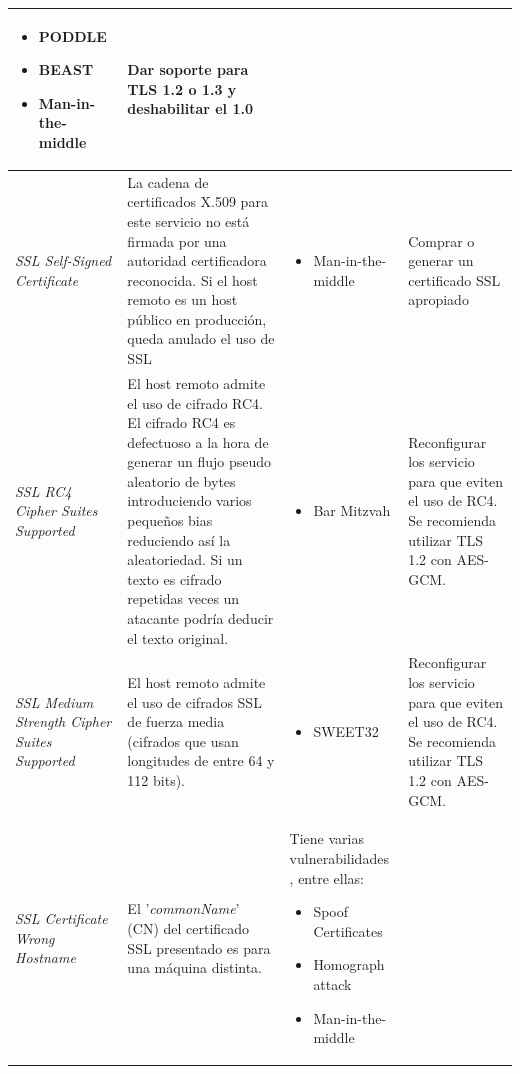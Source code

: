 \documentclass[10pt,a4paper]{article}
\begin{document}
\begin{enumerate}[label=\textbf{\alph*)}]
\begin{longtable}{| p{} | p{} | p{} | p{} |}
\begin{itemize}
\item PODDLE\cite{poddle}
\item BEAST\cite{beast}
\item Man-in-the-middle\cite{mitm}
\end{itemize}
& Dar soporte para TLS 1.2 o 1.3 y deshabilitar el 1.0\\ 
\hline
\textit{SSL Self-Signed Certificate} & La cadena de certificados X.509 para este servicio no está firmada por una autoridad certificadora reconocida. Si el host remoto es un host público en producción, queda anulado el uso de SSL 
& 
\begin{itemize}
\item Man-in-the-middle\cite{mitm}
\end{itemize}
& Comprar o generar un certificado SSL apropiado\\ 
\hline 
\textit{SSL RC4 Cipher Suites Supported} & 
El host remoto admite el uso de cifrado RC4.
El cifrado RC4 es defectuoso a la hora de generar un flujo pseudo aleatorio de bytes introduciendo varios pequeños bias reduciendo así la aleatoriedad. Si un texto es cifrado repetidas veces un atacante podría deducir el texto original. 
& 
\begin{itemize}
\item Bar Mitzvah\cite{bar}
\end{itemize}
& Reconfigurar los servicio para que eviten el uso de RC4. Se recomienda utilizar TLS 1.2 con AES-GCM.\\ 
\hline
\textit{SSL Medium Strength Cipher Suites Supported} & 
El host remoto admite el uso de cifrados SSL de fuerza media (cifrados que usan longitudes de entre 64 y 112 bits).
&
\begin{itemize}
\item SWEET32\cite{sweet32}\cite{tls}
\end{itemize}
& Reconfigurar los servicio para que eviten el uso de RC4. Se recomienda utilizar TLS 1.2 con AES-GCM.\\ 
\hline
\textit{SSL Certificate Wrong Hostname} & El '\textit{commonName}' (CN) del certificado SSL presentado es para una máquina distinta.
&
Tiene varias vulnerabilidades \cite{improper}, entre ellas:
\begin{itemize}
\item Spoof Certificates\cite{spoof}
\item Homograph attack\cite{homo}
\item Man-in-the-middle\cite{mitm}
\end{itemize}

\end{longtable}
\end{enumerate}
\end{document}
